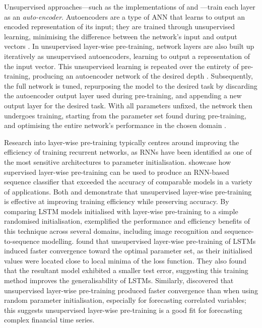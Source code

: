 \documentclass[a4paper, 11pt]{report}
\begin{document}
    Unsupervised approaches---such as the implementations of \citet{xu-2018} and \citet{sagheer-2019}---train each layer as an \emph{auto-encoder}. Autoencoders are a type of ANN that learns to output an encoded representation of its input; they are trained through unsupervised learning, minimising the difference between the network's input and output vectors \citep{pinaya-2019}. In unsupervised layer-wise pre-training, network layers are also built up iteratively as unsupervised autoencoders, learning to output a representation of the input vector. This unsupervised learning is repeated over the entirety of pre-training, producing an autoencoder network of the desired depth \citep{sagheer-2019}. Subsequently, the full network is tuned, repurposing the model to the desired task by discarding the autoencoder output layer used during pre-training, and appending a new output layer for the desired task. With all parameters unfixed, the network then undergoes training, starting from the parameter set found during pre-training, and optimising the entire network's performance in the chosen domain \citep{sagheer-2019}.

    Research into layer-wise pre-training typically centres around improving the efficiency of training recurrent networks, as RNNs have been identified as one of the most sensitive architectures to parameter initialisation. \citet{ienco-2019} showcase how supervised layer-wise pre-training can be used to produce an RNN-based sequence classifier that exceeded the accuracy of comparable models in a variety of applications. Both \citet{xu-2018} and \citet{sagheer-2019} demonstrate that unsupervised layer-wise pre-training is effective at improving training efficiency while preserving accuracy. By comparing LSTM models initialised with layer-wise pre-training to a simple randomised initialisation, \citet{xu-2018} exemplified the performance and efficiency benefits of this technique across several domains, including image recognition and sequence-to-sequence modelling. \citet{xu-2018} found that unsupervised layer-wise pre-training of LSTMs induced faster convergence toward the optimal parameter set, as their initialised values were located close to local minima of the loss function. They also found that the resultant model exhibited a smaller test error, suggesting this training method improves the generalisability of LSTMs. Similarly, \citet{sagheer-2019} discovered that unsupervised layer-wise pre-training produced faster convergence than when using random parameter initialisation, especially for forecasting correlated variables; this suggests unsupervised layer-wise pre-training is a good fit for forecasting complex financial time series.
\end{document}
